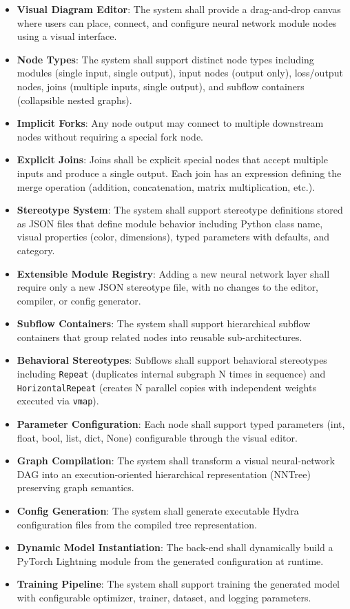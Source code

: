 \documentclass[11pt,a4paper]{article}
\begin{document}
\begin{itemize}
	\item \textbf{Visual Diagram Editor}: The system shall provide a drag-and-drop canvas where users can place, connect, and configure neural network module nodes using a visual interface.
	\item \textbf{Node Types}: The system shall support distinct node types including modules (single input, single output), input nodes (output only), loss/output nodes, joins (multiple inputs, single output), and subflow containers (collapsible nested graphs).
	\item \textbf{Implicit Forks}: Any node output may connect to multiple downstream nodes without requiring a special fork node.
	\item \textbf{Explicit Joins}: Joins shall be explicit special nodes that accept multiple inputs and produce a single output. Each join has an expression defining the merge operation (addition, concatenation, matrix multiplication, etc.).
	\item \textbf{Stereotype System}: The system shall support stereotype definitions stored as JSON files that define module behavior including Python class name, visual properties (color, dimensions), typed parameters with defaults, and category.
	\item \textbf{Extensible Module Registry}: Adding a new neural network layer shall require only a new JSON stereotype file, with no changes to the editor, compiler, or config generator.
	\item \textbf{Subflow Containers}: The system shall support hierarchical subflow containers that group related nodes into reusable sub-architectures.
	\item \textbf{Behavioral Stereotypes}: Subflows shall support behavioral stereotypes including \texttt{Repeat} (duplicates internal subgraph N times in sequence) and \texttt{HorizontalRepeat} (creates N parallel copies with independent weights executed via \texttt{vmap}).
	\item \textbf{Parameter Configuration}: Each node shall support typed parameters (int, float, bool, list, dict, None) configurable through the visual editor.
	\item \textbf{Graph Compilation}: The system shall transform a visual neural-network DAG into an execution-oriented hierarchical representation (NNTree) preserving graph semantics.
	\item \textbf{Config Generation}: The system shall generate executable Hydra configuration files from the compiled tree representation.
	\item \textbf{Dynamic Model Instantiation}: The back-end shall dynamically build a PyTorch Lightning module from the generated configuration at runtime.
	\item \textbf{Training Pipeline}: The system shall support training the generated model with configurable optimizer, trainer, dataset, and logging parameters.
\end{itemize}
\end{document}
